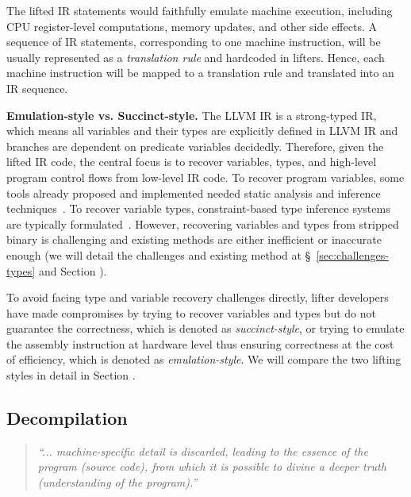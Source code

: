 The lifted IR statements would faithfully emulate machine execution, including
CPU register-level computations, memory updates, and other side effects. A
sequence of IR statements, corresponding to one machine instruction, will be
usually represented as a \textit{translation rule} and hardcoded in lifters.
Hence, each machine instruction will be mapped to a translation rule and
translated into an IR sequence.

\noindent \textbf{Emulation-style vs. Succinct-style.} The LLVM IR is a
strong-typed IR, which means all variables and their types are explicitly
defined in LLVM IR and branches are dependent on predicate variables
decidedly. Therefore, given the lifted IR code, the central focus is to
recover variables, types, and high-level program control flows from low-level
IR code. To recover program variables, some tools already proposed and
implemented needed static analysis and inference
techniques~\cite{anand2013compiler,balakrishnan2010wysinwyx,balakrishnan2007divine,reps2008improved,elwazeer2013scalable}.
To recover variable types, constraint-based type inference systems are
typically formulated~\cite{lee2011tie,noonan2016polymorphic}. However,
recovering variables and types from stripped binary is challenging and
existing methods are either inefficient or inaccurate enough (we will detail
the challenges and existing method at \S~\ref{sec:challenges-types} and Section ).

To avoid facing type and variable recovery challenges directly, lifter
developers have made compromises by trying to recover variables and types but
do not guarantee the correctness, which is denoted as \textit{succinct-style},
or trying to emulate the assembly instruction at hardware level thus ensuring
correctness at the cost of efficiency, which is denoted as \textit{emulation-style}.
We will compare the two lifting styles in detail in Section .

\subsection{Decompilation} \label{subsec:background-decompilation}

\begin{quote}
\textit{``... machine-specific detail is discarded, leading to the essence of
the program (source code), from which it is possible to divine a deeper truth
(understanding of the program).''}~\cite{van2007static}
\end{quote}

